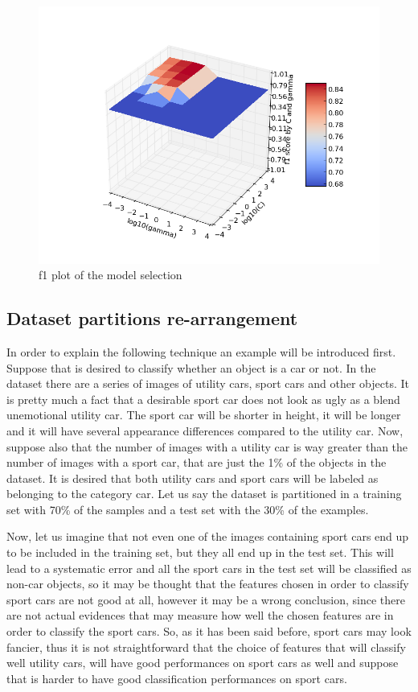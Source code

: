 \documentclass[aps,letterpaper,10pt]{revtex4}
\begin{document}
\begin{figure}[]
  \includegraphics[width=\linewidth]{img/f1_graph.png}
  \caption{f1 plot of the model selection}\label{fig:9}
\endminipage
\end{figure}

\subsection{Dataset partitions re-arrangement}
In order to explain the following technique an example will be introduced first. Suppose that is desired to classify whether an object is a car or not. In the dataset there are a series of images of utility cars, sport cars and other objects. It is pretty much a fact that a desirable sport car does not look as ugly as a blend unemotional utility car. The sport car will be shorter in height, it will be longer and it will have several appearance differences compared to the utility car. Now, suppose also that the number of images with a utility car is way greater than the number of images with a sport car, that are just the 1\% of the objects in the dataset. It is desired that both utility cars and sport cars will be labeled as belonging to the category car. Let us say the dataset is partitioned in a training set with 70\% of the samples and a test set with the 30\% of the examples. 

Now, let us imagine that not even one of the images containing sport cars end up to be included in the training set, but they all end up in the test set. This will lead to a systematic error and all the sport cars in the test set will be classified as non-car objects, so it may be thought that the features chosen in order to classify sport cars are not good at all, however it may be a wrong conclusion, since there are not actual evidences that may measure how well the chosen features are in order to classify the sport cars. So, as it has been said before, sport cars may look fancier, thus it is not straightforward that the choice of features that will classify well utility cars, will have good performances on sport cars as well and suppose that is harder to have good classification performances on sport cars. 
\end{document}

